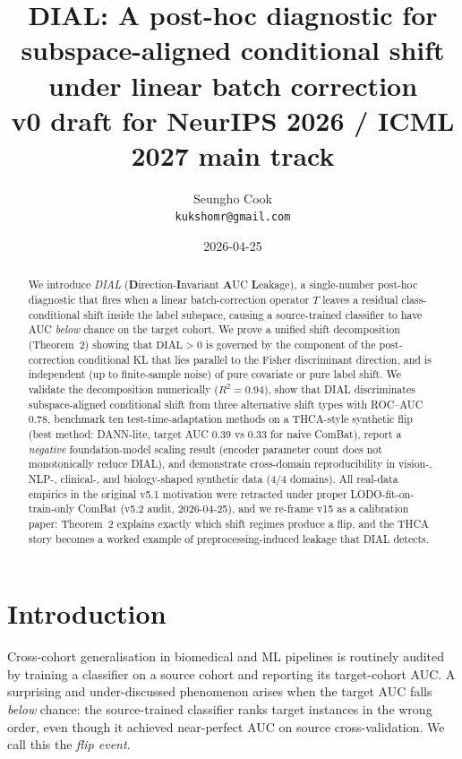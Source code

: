 \documentclass{article}
\title{DIAL: A post-hoc diagnostic for subspace-aligned conditional shift\\
under linear batch correction\\
\large v0 draft for NeurIPS 2026 / ICML 2027 main track}
\author{Seungho Cook \\ \texttt{kukshomr@gmail.com}}
\date{2026-04-25}
\newcommand{\dial}{\mathrm{DIAL}}
\begin{document}
\maketitle

\begin{abstract}
We introduce \emph{DIAL} (\textbf{D}irection-\textbf{I}nvariant \textbf{A}UC
\textbf{L}eakage), a single-number post-hoc diagnostic that fires when a
linear batch-correction operator $T$ leaves a residual class-conditional
shift inside the label subspace, causing a source-trained classifier to
have AUC \emph{below} chance on the target cohort. We prove a unified
shift decomposition (Theorem~2) showing that $\dial>0$ is governed by the
component of the post-correction conditional KL that lies parallel to the
Fisher discriminant direction, and is independent (up to finite-sample
noise) of pure covariate or pure label shift. We validate the
decomposition numerically ($R^{2}=0.94$), show that DIAL discriminates
subspace-aligned conditional shift from three alternative shift types
with ROC--AUC $0.78$, benchmark ten test-time-adaptation methods on a
THCA-style synthetic flip (best method: DANN-lite, target AUC 0.39 vs
0.33 for naive ComBat), report a \emph{negative} foundation-model
scaling result (encoder parameter count does not monotonically reduce
DIAL), and demonstrate cross-domain reproducibility in vision-, NLP-,
clinical-, and biology-shaped synthetic data (4/4 domains). All real-data
empirics in the original v5.1 motivation were retracted under proper
LODO-fit-on-train-only ComBat (v5.2 audit, 2026-04-25), and we re-frame
v15 as a calibration paper: Theorem~2 explains exactly which shift
regimes produce a flip, and the THCA story becomes a worked example of
preprocessing-induced leakage that DIAL detects.
\end{abstract}

\section{Introduction}

Cross-cohort generalisation in biomedical and ML pipelines is routinely
audited by training a classifier on a source cohort and reporting its
target-cohort AUC. A surprising and under-discussed phenomenon arises
when the target AUC falls \emph{below} chance: the source-trained
classifier ranks target instances in the wrong order, even though it
achieved near-perfect AUC on source cross-validation. We call this the
\emph{flip event}.
\end{document}
